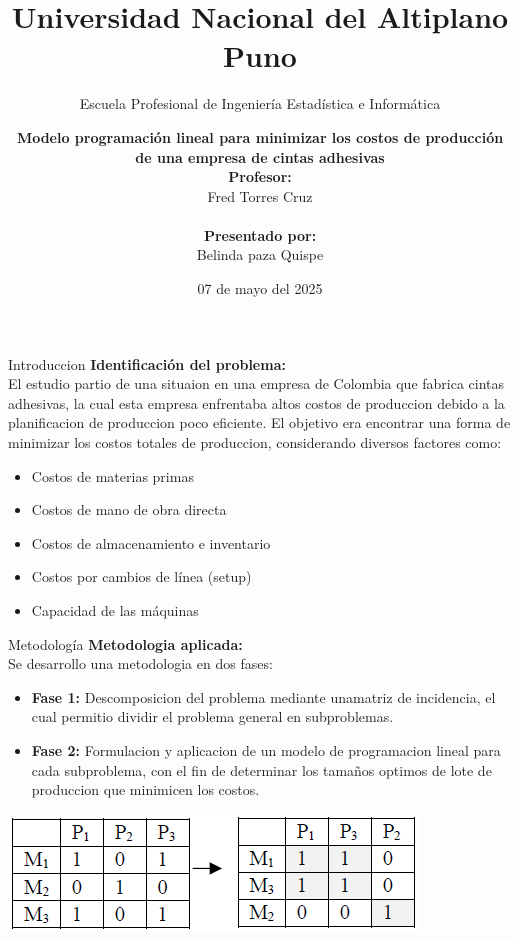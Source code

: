 \documentclass{beamer}
\title{Universidad Nacional del Altiplano Puno}
\subtitle{Escuela Profesional de Ingenier\'ia Estad\'istica e Inform\'atica}
\author{
  \textbf{Modelo programación lineal para minimizar los costos de producción de una empresa de cintas adhesivas} \\
  \vspace{0.5cm}
  \textbf{Profesor:} \\
  Fred Torres Cruz \\
  \\
  \textbf{Presentado por:} \\
  Belinda paza Quispe
}
\institute{}
\date{07 de mayo del 2025}
\begin{document}
\begin{frame}
  \titlepage
\end{frame}

\begin{frame}{Introduccion}
  \textbf{Identificación del problema:} \\
  El estudio partio de una situaion en una empresa de Colombia que fabrica cintas adhesivas, la cual esta empresa enfrentaba altos costos de produccion debido a la planificacion de produccion poco eficiente.
  El objetivo era encontrar una forma de minimizar los costos totales de produccion, considerando diversos factores como:
  \begin{itemize}
    \item Costos de materias primas
    \item Costos de mano de obra directa
    \item Costos de almacenamiento e inventario
    \item Costos por cambios de línea (setup)
    \item Capacidad de las máquinas
  \end{itemize}
\end{frame}

\begin{frame}{Metodolog\'ia}
\small
  \textbf{Metodologia aplicada:} \\
  Se desarrollo una metodologia en dos fases:
  \begin{itemize}
    \item \textbf{Fase 1:} Descomposicion del problema mediante unamatriz de incidencia, el cual permitio dividir el problema general en subproblemas.
    \item \textbf{Fase 2:} Formulacion y aplicacion de un modelo de programacion lineal para cada subproblema, con el fin de determinar los tamaños optimos de lote de produccion que minimicen los costos.
  \end{itemize}
  \begin{center}
    \includegraphics[width=0.50\linewidth]{Captura de pantalla 2025-05-07 003257.png}
  \end{center}
\end{frame}
\end{document}
